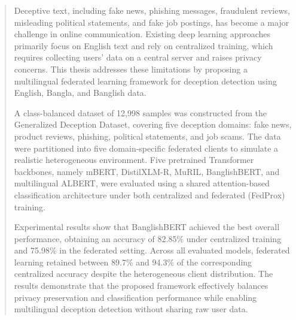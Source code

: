 \begin{abstract}

Deceptive text, including fake news, phishing messages, fraudulent reviews, misleading political statements, and fake job postings, has become a major challenge in online communication. Existing deep learning approaches primarily focus on English text and rely on centralized training, which requires collecting users' data on a central server and raises privacy concerns. This thesis addresses these limitations by proposing a multilingual federated learning framework for deception detection using English, Bangla, and Banglish data.

A class-balanced dataset of 12,998 samples was constructed from the Generalized Deception Dataset, covering five deception domains: fake news, product reviews, phishing, political statements, and job scams. The data were partitioned into five domain-specific federated clients to simulate a realistic heterogeneous environment. Five pretrained Transformer backbones, namely mBERT, DistilXLM-R, MuRIL, BanglishBERT, and multilingual ALBERT, were evaluated using a shared attention-based classification architecture under both centralized and federated (FedProx) training.

Experimental results show that BanglishBERT achieved the best overall performance, obtaining an accuracy of 82.85\% under centralized training and 75.98\% in the federated setting. Across all evaluated models, federated learning retained between 89.7\% and 94.3\% of the corresponding centralized accuracy despite the heterogeneous client distribution. The results demonstrate that the proposed framework effectively balances privacy preservation and classification performance while enabling multilingual deception detection without sharing raw user data.

\end{abstract}